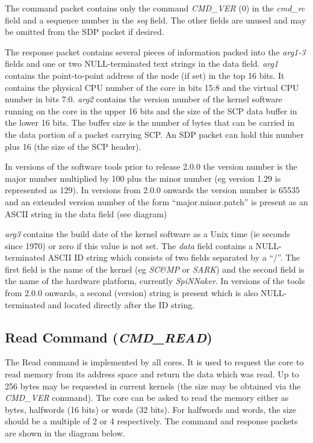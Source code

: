 The command packet contains only the command {\em CMD\_VER} (0) in the
{\em cmd\_rc} field and a sequence number in the {\em seq} field. The
other fields are unused and may be omitted from the SDP packet if
desired.


The response packet contains several pieces of information packed into
the {\em arg1-3} fields and one or two NULL-terminated text strings in
the data field. {\em arg1} contains the point-to-point address of the
node (if set) in the top 16 bits. It contains the physical CPU number
of the core in bits 15:8 and the virtual CPU number in bits 7:0. {\em
arg2} contains the version number of the kernel software running on
the core in the upper 16 bits and the size of the SCP data buffer in
the lower 16 bits.  The buffer size is the number of bytes that can be
carried in the data portion of a packet carrying SCP. An SDP packet
can hold this number plus 16 (the size of the SCP header).

In versions of the software tools prior to release 2.0.0 the version
number is the major number multiplied by 100 plus the minor number (eg
version 1.29 is represented as 129). In versions from 2.0.0 onwards
the version number is 65535 and an extended version number of the
form ``major.minor.patch'' is present as an ASCII string in the data
field (see diagram)

{\em arg3} contains the build date of the kernel software as a Unix
time (ie seconds since 1970) or zero if this value is not set. The
{\em data} field contains a NULL-terminated ASCII ID string which
consists of two fields separated by a ``/''. The first field is the
name of the kernel (eg {\em SC\&MP} or {\em SARK}) and the second
field is the name of the hardware platform, currently {\em
SpiNNaker}. In versions of the tools from 2.0.0 onwards, a second
(version) string is present which is also NULL-terminated and located
directly after the ID string.

\subsection{Read Command ({\em CMD\_READ})}

The Read command is implemented by all cores. It is used to request
the core to read memory from its address space and return the data
which was read. Up to 256 bytes may be requested in current kernels
(the size may be obtained via the {\em CMD\_VER} command). The core
can be asked to read the memory either as bytes, halfwords (16 bits)
or words (32 bits). For halfwords and words, the size should be a
multiple of 2 or 4 respectively. The command and response packets are
shown in the diagram below.

